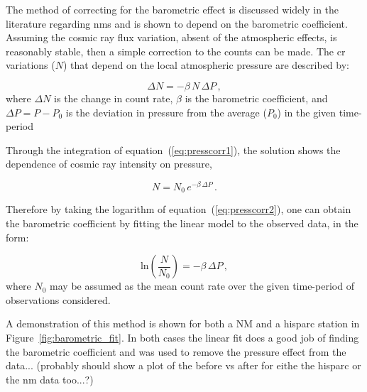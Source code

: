 The method of correcting for the barometric effect is discussed widely in the literature regarding \glspl{nm} and is shown to depend on the barometric coefficient. Assuming the cosmic ray flux variation, absent of the atmospheric effects, is reasonably stable, then a simple correction to the counts can be made. The \gls{cr} variations ($N$) that depend on the local atmospheric pressure are described by:

\begin{equation}
\Delta N = - \beta \, N \, \Delta P \, ,
\label{eq:presscorr1}
\end{equation}
%
where $\Delta N$ is the change in count rate, $\beta$ is the barometric coefficient, and $\Delta P = P - P_0$ is the deviation in pressure from the average ($P_0$) in the given time-period \citep{paschalis_online_2013}

Through the integration of equation~(\ref{eq:presscorr1}), the solution shows the dependence of cosmic ray intensity on pressure,

\begin{equation}
N = N_{0} \, e^{-\beta \, \Delta P} \, .
\label{eq:presscorr2}
\end{equation}

Therefore by taking the logarithm of equation~(\ref{eq:presscorr2}), one can obtain the barometric coefficient by fitting the linear model to the observed data, in the form:

\begin{equation}
\mathrm{ln} \left( \frac{N}{N_0} \right) = - \beta \, \Delta P \, ,
\label{eq:presscorr3}
\end{equation}
%
where $N_0$ may be assumed as the mean count rate over the given time-period of observations considered.

A demonstration of this method is shown for both a NM and a \gls{hisparc} station in Figure~\ref{fig:barometric_fit}. In both cases the linear fit does a good job of finding the barometric coefficient and was used to remove the pressure effect from the data... (probably should show a plot of the before vs after for eithe the hisparc or the nm data too...?)

